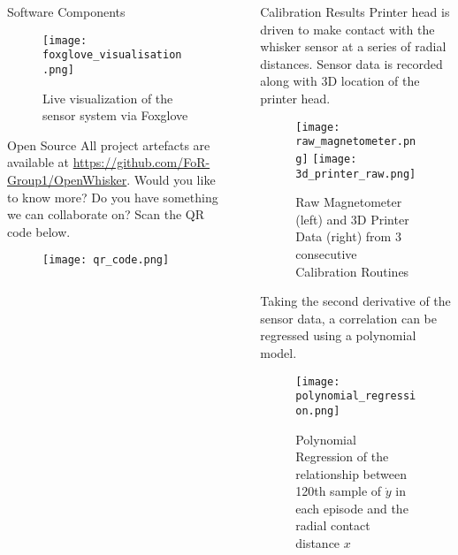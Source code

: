 \documentclass[final]{beamer}
\newlength{\sepwidth}
\newlength{\colwidth}
\newcommand{\separatorcolumn}{\begin{column}{\sepwidth}\end{column}}
\begin{document}
\begin{frame}[t]
\begin{columns}[t]
\begin{column}{\colwidth}
\begin{block}{Software Components}
    \begin{figure}
      \centering
      \texttt{[image: foxglove\_visualisation.png]}
      \caption{Live visualization of the sensor system via Foxglove}
      \label{fig:foxglove}
    \end{figure}
  \end{block}

  \begin{block}{Open Source}
    All project artefacts are available at \url{https://github.com/FoR-Group1/OpenWhisker}. Would you like to know more? Do you have something we can collaborate on? Scan the QR code below.
    \begin{figure}
      \centering
      \texttt{[image: qr\_code.png]}
      \label{fig:github}
    \end{figure}
  \end{block}

\end{column}

\separatorcolumn

\begin{column}{\colwidth}

  \begin{block}{Calibration Results}
    Printer head is driven to make contact with the whisker sensor at a series of radial distances. Sensor data is recorded along with 3D location of the printer head.

    \begin{figure}
      \centering
      \texttt{[image: raw\_magnetometer.png]}
      \hspace{1pt}
      \texttt{[image: 3d\_printer\_raw.png]}
      \caption{Raw Magnetometer (left) and 3D Printer Data (right) from 3 consecutive Calibration Routines}
      \label{fig:calibration_routine}
    \end{figure}

    Taking the second derivative of the sensor data, a correlation can be regressed using a polynomial model.
  
    \begin{figure}
      \centering
      \texttt{[image: polynomial\_regression.png]}
      \caption{Polynomial Regression of the relationship between 120th sample of \(\dot{y}\) in each episode and the radial contact distance \(x\)}
      \label{fig:polynomial_regression.png}
    \end{figure}


\end{block}
\end{column}
\end{columns}
\end{frame}
\end{document}
